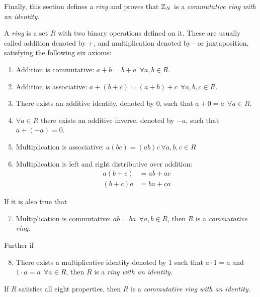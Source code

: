 \par Finally, this section defines a {\em ring} and proves that $\mathbb{Z}_N$ is a
{\em commutative ring with an identity}.
\begin{definition}
\label{def:ring}
  A {\em ring} is a set $R$ with two binary operations defined on it. These are usually
  called addition denoted by +, and multiplication denoted by $\cdot$ or juxtaposition,
  satisfying the following six axioms:
  \begin{enumerate}
    \item Addition is commutative: $a+b=b+a \ \ \forall a,b \in R$.
    \item Addition is associative: $a+(b+c)=(a+b)+c \ \ \forall a,b,c \in R$.
    \item There exists an additive identity, denoted by 0, such that $a+0=a \ \ \forall a \in R$.
    \item $\forall a \in R$ there exists an additive inverse, denoted by $-a$, such
      that $a+(-a)=0$.
    \item Multiplication is associative: $a(bc)=(ab)c \ \forall a,b,c \in R$
    \item Multiplication is left and right distributive over addition:
      \begin{align*}
        a(b+c)&=ab+ac \\
        (b+c)a&=ba+ca
      \end{align*}
  \end{enumerate}
  If it is also true that
  \begin{enumerate}
      \setcounter{enumi}{6}
    \item Multiplication is commutative: $ab=ba \ \ \forall a,b \in R$, then
      $R$ is a {\em commutative ring}.
  \end{enumerate}
  Further if
  \begin{enumerate}
      \setcounter{enumi}{7}
    \item There exists a multiplicative identity denoted by 1 such that
      $a \cdot 1=a$ and $1 \cdot a=a \ \ \forall a \in R$, then $R$ is a
      {\em ring with an identity}.
  \end{enumerate}
  If $R$ satisfies all eight properties, then $R$ is a {\em commutative ring with
  an identity.}
\end{definition}

